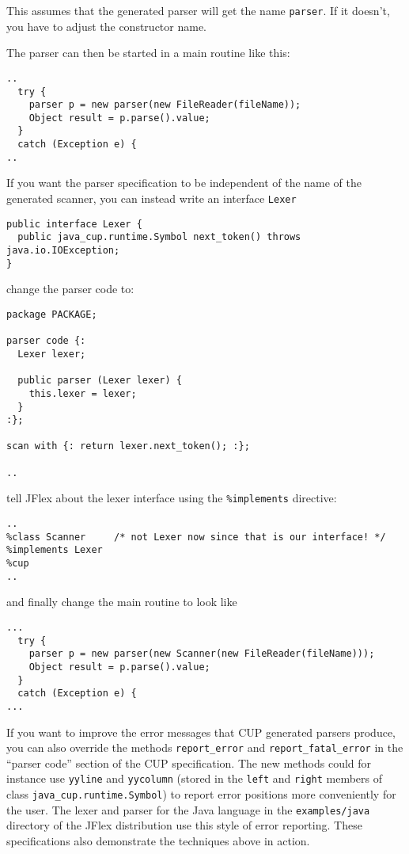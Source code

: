 \documentclass[11pt]{scrartcl}
\newcommand{\xsmall}{}
\begin{document}
This assumes that the generated parser will get the name \texttt{parser}.
If it doesn't, you have to adjust the constructor name.

The parser can then be started in a main routine like this:

{\xsmall\begin{verbatim}
..
  try {
    parser p = new parser(new FileReader(fileName));
    Object result = p.parse().value; 
  }
  catch (Exception e) {
..
\end{verbatim} 
}

If you want the parser specification to be independent of the name of the generated
scanner, you can instead write an interface \texttt{Lexer}

{\xsmall\begin{verbatim}
public interface Lexer {
  public java_cup.runtime.Symbol next_token() throws java.io.IOException;
}
\end{verbatim}
}

change the parser code to:

{\xsmall\begin{verbatim}
package PACKAGE;

parser code {:
  Lexer lexer;

  public parser (Lexer lexer) {
    this.lexer = lexer;
  }
:};

scan with {: return lexer.next_token(); :};

..
\end{verbatim}
}

tell JFlex about the lexer 
interface using the \texttt{\%implements}
directive:

{\xsmall\begin{verbatim}
..
%class Scanner     /* not Lexer now since that is our interface! */
%implements Lexer
%cup
..
\end{verbatim}
}

and finally change the main routine to look like

{\xsmall\begin{verbatim}
...
  try {
    parser p = new parser(new Scanner(new FileReader(fileName)));
    Object result = p.parse().value;
  }
  catch (Exception e) {
...
\end{verbatim}
}

If you want to improve the error messages that CUP generated parsers
produce, you can also override the methods \texttt{report\_error} and \texttt{report\_fatal\_error}
in the ``parser code'' section of the CUP specification. The new methods
could for instance use \texttt{yyline} and \texttt{yycolumn} (stored in
the \texttt{left} and \texttt{right} members of class \texttt{java\_cup.runtime.Symbol})
to report error positions more conveniently for the user. The lexer and
parser for the Java language in the \texttt{examples/java} directory of the
JFlex distribution use this style of error reporting. These specifications
also demonstrate the techniques above in action.
\end{document}
